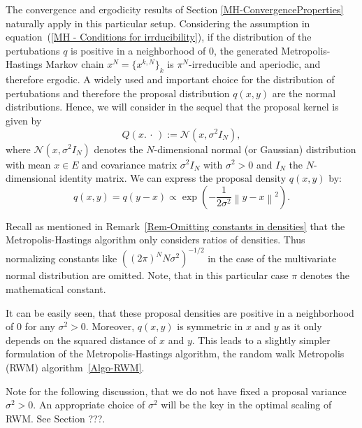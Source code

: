 The convergence and ergodicity results of Section \ref{MH-ConvergenceProperties} naturally apply in this particular setup. Considering the assumption in equation~(\ref{MH - Conditions for irrducibility}), if the distribution of the pertubations $q$ is positive in a neighborhood of 0, the generated Metropolis-Hastings Markov chain $ x^{N} = \{ x^{k,N} \}_{k} $ is $ \pi^{N} $-irreducible and aperiodic, and therefore ergodic. A widely used and important choice for the distribution of pertubations and therefore the proposal distribution $ q(x,y) $ are the normal distributions. Hence, we will consider in the sequel that the proposal kernel is given by
\begin{equation}
\label{RWM-GaussianProposalKernel}
 Q(x. \, \cdot \,) := \mathcal{N}(x, \sigma^2 I_{N} ),
\end{equation}
where $ \mathcal{N}(x, \sigma^2 I_{N} ) $ denotes the $N$-dimensional normal (or Gaussian) distribution with mean $x \in E$ and covariance matrix $ \sigma^2 I_{N} $ with $ \sigma^2 > 0 $ and $ I_{N} $ the $N$-dimensional identity matrix. We can express the proposal density $ q(x,y) $ by:
\begin{equation}
 q(x,y) = q(y-x) \varpropto  \exp{ \left( - \frac{1}{2 \sigma^2} \left\| y-x \right\|^2  \right) }.
\end{equation}

Recall as mentioned in Remark~\ref{Rem-Omitting constants in densities} that the Metropolis-Hastings algorithm only considers ratios of densities. Thus normalizing constants like $ \left( (2 \pi)^{N} N \sigma^2 \right)^{-1/2} $ in the case of the multivariate normal distribution are omitted. Note, that in this particular case $\pi$ denotes the mathematical constant.

It can be easily seen, that these proposal densities are positive in a neighborhood of 0 for any $ \sigma^2 > 0 $. Moreover, $ q(x,y) $ is symmetric in $x$ and $y$ as it only depends on the squared distance of $x$ and $y$. This leads to a slightly simpler formulation of the Metropolis-Hastings algorithm, the random walk Metropolis (RWM) algorithm~\ref{Algo-RWM}.

Note for the following discussion, that we do not have fixed a proposal variance $ \sigma^2 > 0 $. An appropriate choice of $ \sigma^2 $ will be the key in the optimal scaling of RWM. See Section ???.


